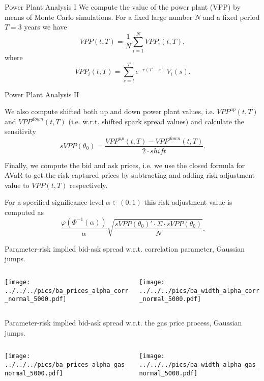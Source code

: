 {Power Plant Analysis I}
  We compute the value of the power plant (VPP) by means of Monte Carlo simulations. For a fixed large number $N$ and a fixed period $T=3$ years we have $$VPP(t,T) = \frac{1}{N}\sum_{i=1}^{N}VPP_i(t,T),$$ where $$VPP_i(t,T) = \sum_{s=t}^{T}e^{-r(T-s)}\,V_i(s).$$

{Power Plant Analysis II}


	We also compute shifted both up and down power plant values, i.e. $VPP^{up}(t,T)$ and $VPP^{down}(t,T)$ (i.e. w.r.t. shifted spark spread values) and calculate the sensitivity $$sVPP(\theta_0) = \frac{VPP^{up}(t,T) - VPP^{down}(t,T)}{2 \cdot shift}.$$

	Finally, we compute the bid and ask prices, i.e. we use the closed formula for AVaR to get the risk-captured prices by subtracting and adding risk-adjustment value to $VPP(t,T)$ respectively.

	For a specified significance level $\alpha \in (0, 1)$ this risk-adjustment value is computed as $$\frac{\varphi(\Phi^{-1}(\alpha))}{\alpha}\sqrt{\frac{sVPP(\theta_0)' \cdot \Sigma \cdot sVPP(\theta_0) }{N}}.$$


{Parameter-risk implied bid-ask spread w.r.t. correlation parameter, Gaussian jumps.}
\begin{columns}[t]
\begin{column}[l]{0.6\textwidth}
\texttt{[image: ../../../pics/ba\_prices\_alpha\_corr\_normal\_5000.pdf]}
\end{column}
\begin{column}[r]{0.6\textwidth}
\texttt{[image: ../../../pics/ba\_width\_alpha\_corr\_normal\_5000.pdf]}
\end{column}
\end{columns}

{Parameter-risk implied bid-ask spread w.r.t. the gas price process, Gaussian jumps.}
\begin{columns}[t]
\begin{column}[l]{0.6\textwidth}
\texttt{[image: ../../../pics/ba\_prices\_alpha\_gas\_normal\_5000.pdf]}
\end{column}
\begin{column}[r]{0.6\textwidth}
\texttt{[image: ../../../pics/ba\_width\_alpha\_gas\_normal\_5000.pdf]}
\end{column}
\end{columns}

